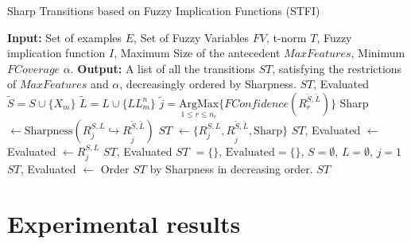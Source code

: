 \begin{algorithm}[!t]
	\caption{Sharp Transitions based on Fuzzy Implication Functions (STFI)}\label{alg:STFI} 
	\begin{algorithmic}
		\State \textbf{Input:} Set of examples $E$, Set of Fuzzy Variables $FV$, t-norm $T$, Fuzzy implication function $I$, Maximum Size of the antecedent $MaxFeatures$, Minimum $FCoverage$ $\alpha$.
		\State \textbf{Output:} A list of all the transitions $ST$, satisfying the restrictions of $MaxFeatures$ and $\alpha$, decreasingly ordered by Sharpness.
		\State
		\State \Return $ST$, Evaluated
		\EndIf
		\State $\tilde{S} = S \cup \{X_m\}$
		\State $\tilde{L} = L \cup \{LL^n_m\}$
		\State $\tilde{j}= \underset{1 \leq r \leq n_c}{\text{ArgMax}} \{FConfidence(R_r^{\tilde{S},\tilde{L}}) \}$
		\State Sharp $\leftarrow \text{Sharpness}(R_j^{S,L} \hookrightarrow R_{\tilde{j}}^{\tilde{S},\tilde{L}})$
		\State $ST$ $\leftarrow \{R_j^{S,L},R_{\tilde{j}}^{\tilde{S},\tilde{L}}, \text{Sharp} \}$
		\EndIf
		\State $ST$, Evaluated $\leftarrow$
		\EndIf
		\EndFor
		\EndFor
		\State Evaluated $\leftarrow R_j^{S,L}$
		\State \Return $ST$, Evaluated
		\EndFunction
		\State
		\State $ST$ $= \{\}$, $\text{Evaluated} = \{\}$, $S=\emptyset$, $L=\emptyset$, $j=1$
		\State $ST$, Evaluated $\leftarrow$ 
		\State Order $ST$ by Sharpness in decreasing order.
		\State \Return $ST$
		\EndFunction
	\end{algorithmic}
\end{algorithm}

\section{Experimental results}\label{section:experimental_results}

